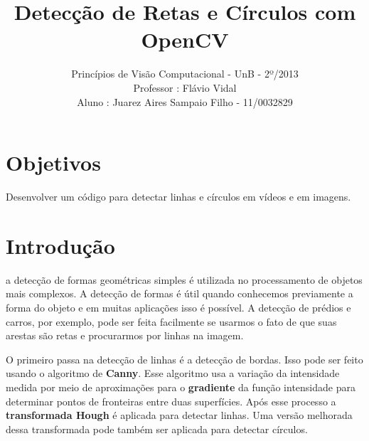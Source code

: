\documentclass[journal]{IEEEtran}
\begin{document}
\title{ 
Detecção de Retas e Círculos com OpenCV}

\author{
		Princípios de Visão Computacional - UnB - 2º/2013 \\
		Professor : Flávio Vidal \\
		Aluno : Juarez Aires Sampaio Filho - 11/0032829 \\
		}


\maketitle
\IEEEpeerreviewmaketitle

\section{Objetivos} 
Desenvolver um código para detectar linhas e círculos em 
vídeos e em imagens.
\section{Introdução}

 a detecção de formas geométricas
simples é utilizada no processamento de objetos mais complexos.
 A detecção de formas é útil quando conhecemos previamente 
a forma do objeto e em muitas aplicações isso é possível.  A detecção
de prédios e carros, por exemplo, pode ser feita facilmente se 
usarmos o fato de que suas arestas são retas e procurarmos por linhas 
na imagem.

O primeiro passa na detecção de linhas é a detecção de bordas. Isso pode
ser feito usando o algoritmo de \textbf{Canny}. Esse algoritmo usa a variação da intensidade
medida por meio de aproximações para o \textbf{gradiente} da função intensidade para 
determinar pontos de fronteiras entre duas superfícies. Após esse processo a
\textbf{transformada Hough} é aplicada para detectar linhas. Uma versão melhorada dessa
transformada pode também ser aplicada para detectar círculos.
\end{document}

